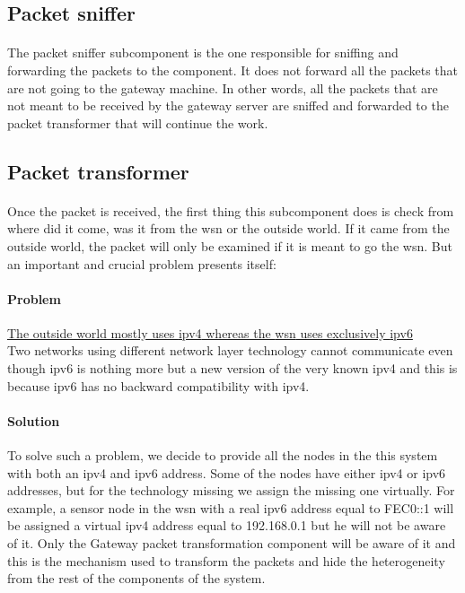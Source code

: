 \documentclass[oneside,12pt,a4paper,final]{book}
\begin{document}
\subsection{Packet sniffer}
\paragraph{}
The packet sniffer subcomponent is the one responsible for sniffing and forwarding the packets to the component. It does not forward all the packets that are not going to the gateway machine. In other words, all the packets that are not meant to be received by the gateway server are sniffed and forwarded to the packet transformer that will continue the work.
\subsection{Packet transformer}
\paragraph{}
Once the packet is received, the first thing this subcomponent does is check from where did it come, was it from the \gls{wsn} or the outside world. If it came from the outside world, the packet will only be examined if it is meant to go the \gls{wsn}. But an important and crucial problem presents itself:
\paragraph{Problem}
\underline{The outside world mostly uses \gls{ipv4} whereas the \gls{wsn} uses exclusively \gls{ipv6}} \\
Two networks using different network layer technology cannot communicate even though \gls{ipv6} is nothing more but a new version of the very known \gls{ipv4} and this is because \gls{ipv6} has no backward compatibility with \gls{ipv4}.
\paragraph{Solution}
To solve such a problem, we decide to provide all the nodes in the this system with both an \gls{ipv4} and \gls{ipv6} address. Some of the nodes have either \gls{ipv4} or \gls{ipv6} addresses, but for the technology missing we assign the missing one virtually. For example, a sensor node in the \gls{wsn} with a real \gls{ipv6} address equal to FEC0::1 will be assigned a virtual \gls{ipv4} address equal to 192.168.0.1 but he will not be aware of it. Only the Gateway packet transformation component will be aware of it and this is the mechanism used to transform the packets and hide the heterogeneity from the rest of the components of the system.
\end{document}

